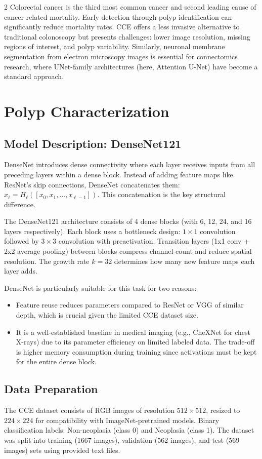 ﻿\documentclass[a4paper,10pt]{article}
\begin{document}
\begin{multicols*}{2}
Colorectal cancer is the third most common cancer and second leading cause of cancer-related mortality. Early detection through polyp identification can significantly reduce mortality rates. CCE offers a less invasive alternative to traditional colonoscopy but presents challenges: lower image resolution, missing regions of interest, and polyp variability. Similarly, neuronal membrane segmentation from electron microscopy images is essential for connectomics research, where UNet-family architectures (here, Attention U-Net) have become a standard approach.

\section{Polyp Characterization}

\subsection{Model Description: DenseNet121}
DenseNet introduces dense connectivity where each layer receives inputs from all preceding layers within a dense block. Instead of adding feature maps like ResNet's skip connections, DenseNet concatenates them: \(x_\ell = H_\ell([x_0, x_1, ..., x_{\ell-1}])\). This concatenation is the key structural difference.

The DenseNet121 architecture consists of 4 dense blocks (with 6, 12, 24, and 16 layers respectively). Each block uses a bottleneck design: \(1 \times 1\) convolution followed by \(3 \times 3\) convolution with preactivation. Transition layers (1x1 conv + 2x2 average pooling) between blocks compress channel count and reduce spatial resolution. The growth rate \(k=32\) determines how many new feature maps each layer adds.

DenseNet is particularly suitable for this task for two reasons: 
\begin{itemize}
	\item Feature reuse reduces parameters compared to ResNet or VGG of similar depth, which is crucial given the limited CCE dataset size.
	\item It is a well-established baseline in medical imaging (e.g., CheXNet for chest X-rays) due to its parameter efficiency on limited labeled data. The trade-off is higher memory consumption during training since activations must be kept for the entire dense block.
\end{itemize}

\subsection{Data Preparation}
The CCE dataset consists of RGB images of resolution \(512 \times 512\), resized to \(224 \times 224\) for compatibility with ImageNet-pretrained models. Binary classification labels: Non-neoplasia (class 0) and Neoplasia (class 1). The dataset was split into training (1667 images), validation (562 images), and test (569 images) sets using provided text files.


\end{multicols*}
\end{document}
